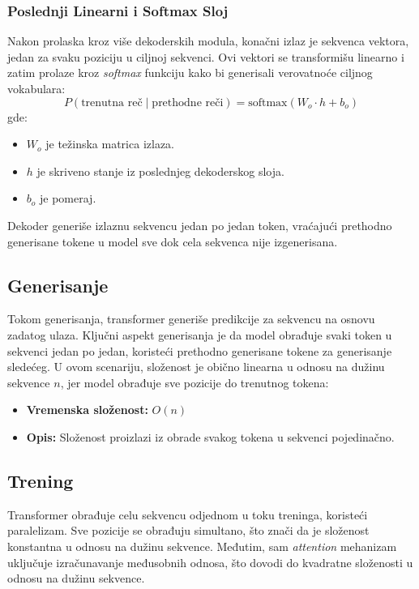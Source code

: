 \documentclass[12pt]{article}
\begin{document}
   \subsubsection*{Poslednji Linearni i Softmax Sloj}
   Nakon prolaska kroz više dekoderskih modula, konačni izlaz je sekvenca vektora, 
   jedan za svaku poziciju u ciljnoj sekvenci. Ovi vektori se transformišu 
   linearno i zatim prolaze kroz \textit{softmax} funkciju kako bi generisali verovatnoće 
   ciljnog vokabulara:
   \[
   P(\text{trenutna reč} \mid \text{prethodne reči}) = \text{softmax}(W_o \cdot h + b_o)
   \]
   \newpage
   gde:
   \begin{itemize}
      \vspace{-0.5cm}
      \setlength\itemsep{0.2em} %
      \item \( W_o \) je težinska matrica izlaza.
      \item \( h \) je skriveno stanje iz poslednjeg dekoderskog sloja.
      \item \( b_o \) je pomeraj.
   \end{itemize}
   Dekoder generiše izlaznu sekvencu jedan po jedan token, vraćajući prethodno 
   generisane tokene u model sve dok cela sekvenca nije izgenerisana.

   \subsection{Generisanje}
   Tokom generisanja, transformer generiše predikcije za sekvencu na osnovu zadatog ulaza. 
   Ključni aspekt generisanja je da model obrađuje svaki token u sekvenci jedan po jedan, 
   koristeći prethodno generisane tokene za generisanje sledećeg. U ovom scenariju, 
   složenost je obično linearna u odnosu na dužinu sekvence \(n\), jer model obrađuje sve 
   pozicije do trenutnog tokena:

   \begin{itemize}
       \item \textbf{Vremenska složenost:} \(O(n)\)
       \item \textbf{Opis:} Složenost proizlazi iz obrade svakog tokena u sekvenci pojedinačno.
   \end{itemize}

   \subsection{Trening}
   Transformer obrađuje celu sekvencu odjednom u toku treninga, koristeći paralelizam. 
   Sve pozicije se obrađuju simultano, što znači da je složenost konstantna u odnosu 
   na dužinu sekvence. Međutim, sam \textit{attention} mehanizam uključuje 
   izračunavanje međusobnih odnosa, što dovodi do kvadratne složenosti u odnosu 
   na dužinu sekvence.
\end{document}
